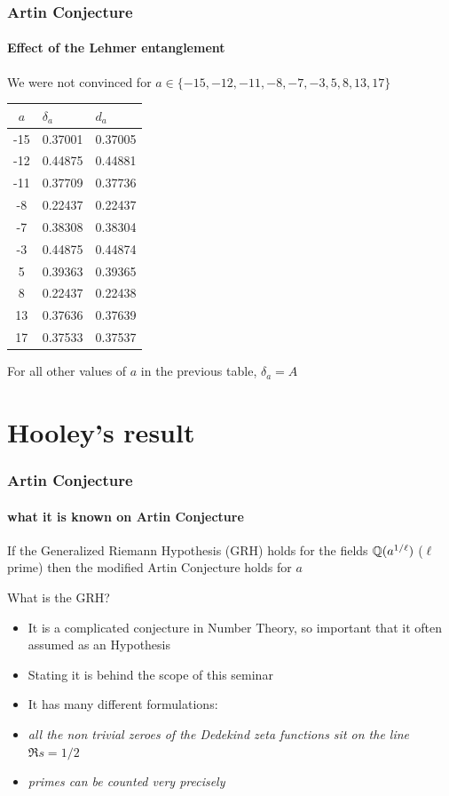 \documentclass[10pt,handout]{beamer} %
\begin{document}
\begin{frame}
\frametitle{Artin Conjecture}
\framesubtitle{Effect of the Lehmer entanglement}

We were not convinced for  $a\in\{-15, -12, -11, -8, -7, -3, 5, 8, 13, 17\}$\pause


\begin{center}
\begin{tabular}{|c|l|l|}
\hline
$a$ & $\delta_a$ & $d_a$ \\
\hline
-15&0.37001 &0.37005\\
-12&0.44875  &0.44881     \\
-11&0.37709 &0.37736\\
-8 &0.22437  &0.22437\\
-7 &0.38308  &0.38304\\
-3 &0.44875  &0.44874\\
 5&0.39363 & 0.39365    \\
 8&0.22437 & 0.22438          \\
13 &0.37636& 0.37639  \\
17 &0.37533& 0.37537 \\
\hline
\end{tabular}\end{center}\pause

For all other values of $a$ in the previous table, $\delta_a=A$

\end{frame}

\section{Hooley's result}

\begin{frame}\frametitle{Artin Conjecture}
\framesubtitle{what it is known on Artin Conjecture}

\begin{theorem}[C. Hooley (1965)] If the Generalized Riemann Hypothesis (GRH)  holds for the fields $\mathbb Q(a^{1/\ell})$ ($\ell$ prime) then the modified Artin Conjecture holds for $a$
\end{theorem}\pause

What is the GRH?\pause

\begin{itemize}[<+-|alert@+>]
\item It is a complicated conjecture in Number Theory, so important that it often assumed as an Hypothesis
\item Stating it is behind the scope of this seminar
\item It has many different formulations:
\item \emph{all the non trivial zeroes of the Dedekind zeta functions sit on the line $\Re s=1/2$}
\item \emph{primes can be counted very precisely}
\end{itemize}

\end{frame}
\end{document}
